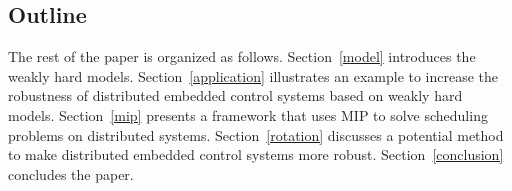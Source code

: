 \subsection{Outline}
The rest of the paper is organized as follows. Section~\ref{model} introduces the weakly hard models. Section~\ref{application} illustrates an example to increase the robustness of distributed embedded control systems based on weakly hard models. Section~\ref{mip} presents a framework that uses MIP to solve scheduling problems on distributed systems. Section~\ref{rotation} discusses a potential method to make distributed embedded control systems more robust. Section~\ref{conclusion} concludes the paper.



